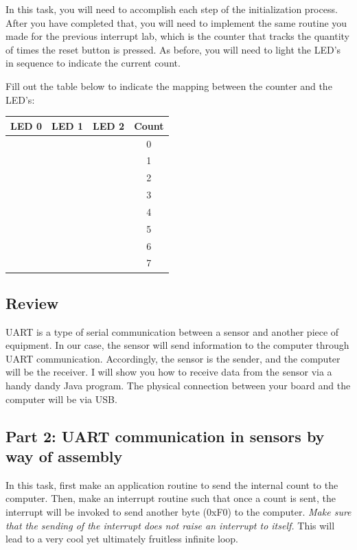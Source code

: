 \documentclass[letterpaper,12pt]{article}
\begin{document}
In this task, you will need to accomplish each step of the initialization process.
After you have completed that, you will need to implement the same routine you made
for the previous interrupt lab, which is the counter that tracks the quantity of times
the reset button is pressed. As before, you will need to light the LED's in sequence to
indicate the current count.

Fill out the table below to indicate the mapping between the counter and the LED's:

\begin{table}[H]
\begin{center}
    \begin{tabular}{|c|c|c|c|}
        \hline
        \textbf{LED 0} & \textbf{LED 1} & \textbf{LED 2} & \textbf{Count} \\ \hline
         & & & 0 \\ \hline
         & & & 1 \\ \hline
         & & & 2 \\ \hline
         & & & 3 \\ \hline
         & & & 4 \\ \hline
         & & & 5 \\ \hline
         & & & 6 \\ \hline
         & & & 7 \\ \hline
    \end{tabular}
\end{center}
\end{table}

\subsection*{Review}
UART is a type of serial communication between a sensor and another piece of equipment.
In our case, the sensor will send information to the computer through UART communication.
Accordingly, the sensor is the sender, and the computer will be the receiver. I will show
you how to receive data from the sensor via a handy dandy Java program.
The physical connection between your board and the computer will be via USB.
\subsection*{Part 2: UART communication in sensors by way of assembly}

In this task, first make an application routine to send the internal count to the computer.
Then, make an interrupt routine such that once a count is sent, the interrupt will be invoked
to send another byte (0xF0) to the computer. \emph{Make sure that the sending of the interrupt
does not raise an interrupt to itself.} This will lead to a very cool yet ultimately fruitless
infinite loop.
\end{document}
